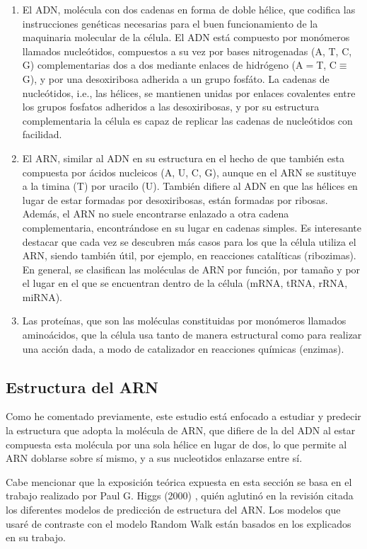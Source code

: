 \documentclass[a4paper,11pt,titlepage]{article}
\theoremstyle{definition}
\begin{document}
\begin{enumerate}
    \item El ADN, molécula con dos cadenas en forma de doble hélice, que codifica las instrucciones genéticas necesarias para el buen funcionamiento de la maquinaria molecular de la célula. El ADN está compuesto por monómeros llamados nucleótidos, compuestos a su vez por bases nitrogenadas (A, T, C, G) complementarias dos a dos mediante enlaces de hidrógeno (A$=$T, C$\equiv$G), y por una desoxiribosa adherida a un grupo fosfáto. La cadenas de nucleótidos, i.e., las hélices, se mantienen unidas por enlaces covalentes entre los grupos fosfatos adheridos a las desoxiribosas, y por su estructura complementaria la célula es capaz de replicar las cadenas de nucleótidos con facilidad.
    \item El ARN, similar al ADN en su estructura en el hecho de que también esta compuesta por ácidos nucleicos (A, U, C, G), aunque en el ARN se sustituye a la timina (T) por uracilo (U). También difiere al ADN en que las hélices en lugar de estar formadas por desoxiribosas, están formadas por ribosas. Además, el ARN no suele encontrarse enlazado a otra cadena complementaria, encontrándose en su lugar en cadenas simples. Es interesante destacar que cada vez se descubren más casos para los que la célula utiliza el ARN, siendo también útil, por ejemplo, en reacciones catalíticas (ribozimas). En general, se clasifican las moléculas de ARN por función, por tamaño y por el lugar en el que se encuentran dentro de la célula (mRNA, tRNA, rRNA, miRNA).
    \item Las proteínas, que son las moléculas constituidas por monómeros llamados aminoácidos, que la célula usa tanto de manera estructural como para realizar una acción dada, a modo de catalizador en reacciones químicas (enzimas).
\end{enumerate}


\subsection{Estructura del ARN}\label{subsec:arn}

Como he comentado previamente, este estudio está enfocado a estudiar y predecir la estructura que adopta la molécula de ARN, que difiere de la del ADN al estar compuesta esta molécula por una sola hélice en lugar de dos, lo que permite al ARN doblarse sobre sí mismo, y a sus nucleotidos enlazarse entre sí.

Cabe mencionar que la exposición teórica expuesta en esta sección se basa en el trabajo realizado por Paul G. Higgs (2000) \cite{phiggs}, quién aglutinó en la revisión citada los diferentes modelos de predicción de estructura del ARN. Los modelos que usaré de contraste con el modelo Random Walk están basados en los explicados en su trabajo.
\end{document}
